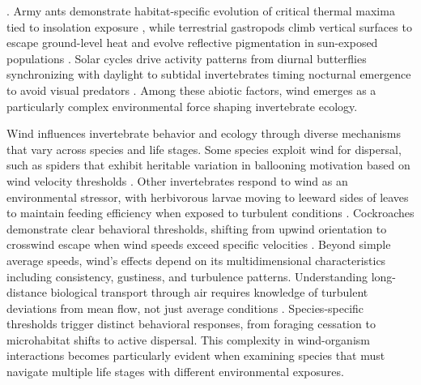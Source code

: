 \citep{gosselinEarlyPostsettlementMortality2010,chapperonThermotoleranceHeatStress2016}. Army ants demonstrate habitat-specific evolution of critical thermal maxima tied to insolation exposure \citep{baudierExtremeInsolationAssociated2018}, while terrestrial gastropods climb vertical surfaces to escape ground-level heat and evolve reflective pigmentation in sun-exposed populations \citep{schweizerSnailsHeatHow2019}. Solar cycles drive activity patterns from diurnal butterflies synchronizing with daylight to subtidal invertebrates timing nocturnal emergence to avoid visual predators \citep{saigusaEmergenceRhythmsSubtidal2001}. Among these abiotic factors, wind emerges as a particularly complex environmental force shaping invertebrate ecology.

Wind influences invertebrate behavior and ecology through diverse mechanisms that vary across species and life stages. Some species exploit wind for dispersal, such as spiders that exhibit heritable variation in ballooning motivation based on wind velocity thresholds \citep{bonteHeritabilitySpiderBallooning2007}. Other invertebrates respond to wind as an environmental stressor, with herbivorous larvae moving to leeward sides of leaves to maintain feeding efficiency when exposed to turbulent conditions \citep{leonardExposureWindAlters2016}. Cockroaches demonstrate clear behavioral thresholds, shifting from upwind orientation to crosswind escape when wind speeds exceed specific velocities \citep{bellSearchAnemotacticOrientation1979}. Beyond simple average speeds, wind's effects depend on its multidimensional characteristics including consistency, gustiness, and turbulence patterns. Understanding long-distance biological transport through air requires knowledge of turbulent deviations from mean flow, not just average conditions \citep{nathanLongdistanceBiologicalTransport2005}. Species-specific thresholds trigger distinct behavioral responses, from foraging cessation to microhabitat shifts to active dispersal. This complexity in wind-organism interactions becomes particularly evident when examining species that must navigate multiple life stages with different environmental exposures.


